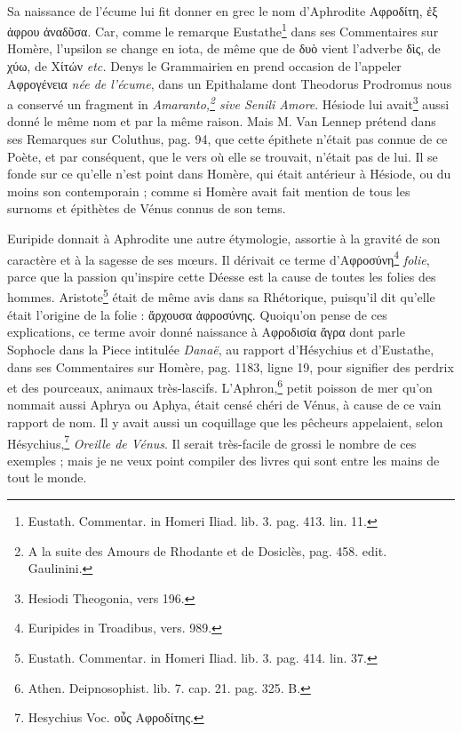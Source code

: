 \documentclass[a4paper, 11pt, oneside, polutonikogreek, french]{article}
\begin{document}
\paragraph{}
Sa naissance de l'écume lui fit donner en grec le nom d'Aphrodite Αφροδίτη, ἐξ ἀφρου ἀναδῦσα. Car, comme le remarque Eustathe\footnote{Eustath. Commentar. in Homeri Iliad. lib. 3. pag. 413. lin. 11.} dans ses Commentaires sur Homère, l'upsilon se change en iota, de même que de δυὸ vient l'adverbe δὶς, de χύω, de Χίτών \emph{etc.} Denys le Grammairien en prend occasion de l'appeler Αφρογένεια \emph{née de l'écume}, dans un Epithalame dont Theodorus Prodromus nous a conservé un fragment in \emph{Amaranto,\footnote{A la suite des Amours de Rhodante et de Dosiclès, pag. 458. edit. Gaulinini.} sive Senili Amore}. Hésiode lui avait\footnote{Hesiodi Theogonia, vers 196.} aussi donné le même nom et par la même raison. Mais M. Van Lennep prétend dans ses Remarques sur Coluthus, pag. 94, que cette épithete n'était pas connue de ce Poète, et par conséquent, que le vers où elle se trouvait, n'était pas de lui. Il se fonde sur ce qu'elle n'est point dans Homère, qui était antérieur à Hésiode, ou du moins son contemporain ; comme si Homère avait fait mention de tous les surnoms et épithètes de Vénus connus de son tems.

Euripide donnait à Aphrodite une autre étymologie, assortie à la gravité de son caractère et à la sagesse de ses mœurs. Il dérivait ce terme d'Αφροσύνη\footnote{Euripides in Troadibus, vers. 989.} \emph{folie}, parce que la passion qu'inspire cette Déesse est la cause de toutes les folies des hommes. Aristote\footnote{Eustath. Commentar. in Homeri Iliad. lib. 3. pag. 414. lin. 37.} était de même avis dans sa Rhétorique, puisqu'il dit qu'elle était l'origine de la folie : ἄρχουσα ἀφροσύνης. Quoiqu'on pense de ces explications, ce terme avoir donné naissance à Αφροδισία ἄγρα dont parle Sophocle dans la Piece intitulée \emph{Danaë}, au rapport d'Hésychius et d'Eustathe, dans ses Commentaires sur Homère, pag. 1183, ligne 19, pour signifier des perdrix et des pourceaux, animaux très-lascifs. L'Aphron,\footnote{Athen. Deipnosophist. lib. 7. cap. 21. pag. 325. B.} petit poisson de mer qu'on nommait aussi Aphrya ou Aphya, était censé chéri de Vénus, à cause de ce vain rapport de nom. Il y avait aussi un coquillage que les pêcheurs appelaient, selon Hésychius,\footnote{Hesychius Voc. οὖς Αφροδίτης.} \emph{Oreille de Vénus}. Il serait très-facile de grossi le nombre de ces exemples ; mais je ne veux point compiler des livres qui sont entre les mains de tout le monde.
\end{document}
